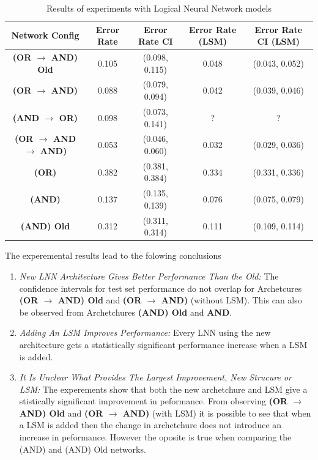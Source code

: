 \begin{table}[H]
	\begin{center}
		\begin{tabular}{| c | c | c | c | c |}
			\hline
			\textbf{Network Config} & \textbf{Error Rate} & \textbf{Error Rate CI} & \textbf{Error Rate (LSM)} & \textbf{Error Rate CI (LSM)}\\
			\hline
			\hline
			\textbf{(OR $\rightarrow$ AND) Old } & 0.105 & (0.098, 0.115) & 0.048 & (0.043, 0.052)\\
			\textbf{(OR $\rightarrow$ AND) } & 0.088 & (0.079, 0.094) & 0.042 & (0.039, 0.046)\\
			\textbf{(AND $\rightarrow$ OR) } & 0.098 & (0.073, 0.141) & ? & ?\\
			\textbf{(OR $\rightarrow$ AND $\rightarrow$ AND) } & 0.053 & (0.046, 0.060) & 0.032 & (0.029, 0.036)\\
			\textbf{(OR) } & 0.382 & (0.381, 0.384) & 0.334 & (0.331, 0.336)\\
			\textbf{(AND) } & 0.137 & (0.135, 0.139) & 0.076 & (0.075, 0.079)\\
			\textbf{(AND) Old} & 0.312 & (0.311, 0.314) & 0.111 & (0.109, 0.114)\\
			\hline
		\end{tabular}
	\end{center}
	\caption{Results of experiments with Logical Neural Network models}
	\label{tab:mnist-lnn-peformance-results}
\end{table}

The experemental results lead to the folowing conclusions
\begin{enumerate}
	\item \textit{New LNN Architecture Gives Better Performance Than the Old:} The confidence intervals for test set performance do not overlap for Archetcures \textbf{(OR $\rightarrow$ AND) Old} and \textbf{(OR $\rightarrow$ AND)} (without LSM). This can also be observed from Archetchures \textbf{(AND) Old} and \textbf{AND}.
	
	\item \textit{Adding An LSM Improves Performance:} Every LNN using the new architecture gets a statistically significant performance increase when a LSM is added.

	\item \textit{It Is Unclear What Provides The Largest Improvement, New Strucure or LSM:} The experements show that both the new archetchure and LSM give a stistically significant improvement in peformance. From observing \textbf{(OR $\rightarrow$ AND) Old} and \textbf{(OR $\rightarrow$ AND)} (with LSM) it is possible to see that when a LSM is added then the change in archetchure does not introduce an increase in peformance. However the oposite is true when comparing the (AND) and (AND) Old networks.
\end{enumerate}

